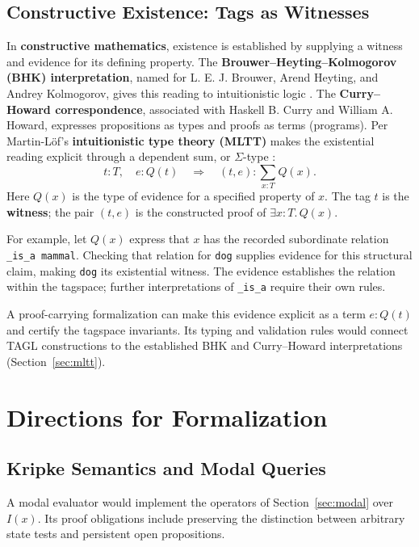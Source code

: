 \documentclass{article}
\begin{document}
\subsection{Constructive Existence: Tags as Witnesses}
\label{sec:constructive}

In \textbf{constructive mathematics}, existence is established by supplying
a witness and evidence for its defining property. The
\textbf{Brouwer--Heyting--Kolmogorov (BHK) interpretation}, named for
L. E. J. Brouwer, Arend Heyting, and Andrey Kolmogorov, gives this reading
to intuitionistic logic \cite{curryhoward}. The \textbf{Curry--Howard
correspondence}, associated with Haskell B. Curry and William A. Howard,
expresses propositions as types and proofs as terms (programs).
Per Martin-L\"{o}f's \textbf{intuitionistic type theory (MLTT)} makes the
existential reading explicit through a dependent sum, or $\Sigma$-type
\cite{mltt}:
\[
  t:T,\quad e:Q(t)
  \quad\Longrightarrow\quad
  (t,e):\sum_{x:T}Q(x).
\]
Here $Q(x)$ is the type of evidence for a specified property of $x$.
The tag $t$ is the \textbf{witness}; the pair $(t,e)$ is the constructed
proof of $\exists x:T.\,Q(x)$.

For example, let $Q(x)$ express that $x$ has the recorded subordinate
relation \texttt{\_is\_a mammal}. Checking that relation for \texttt{dog}
supplies evidence for this structural claim, making \texttt{dog} its
existential witness. The evidence establishes the relation within the
tagspace; further interpretations of \texttt{\_is\_a} require their own
rules.

A proof-carrying formalization can make this evidence explicit as a term
$e:Q(t)$ and certify the tagspace invariants. Its typing and validation
rules would connect TAGL constructions to the established BHK and
Curry--Howard interpretations (Section~\ref{sec:mltt}).

\section{Directions for Formalization}\label{sec:future}

\subsection{Kripke Semantics and Modal Queries}
A modal evaluator would implement the operators of Section~\ref{sec:modal}
over $I(x)$. Its proof obligations include preserving the distinction between
arbitrary state tests and persistent open propositions.
\end{document}
